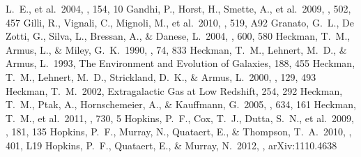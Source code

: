 \documentclass[apj]{emulateapj}
\begin{document}
\begin{thebibliography}{}
  L.~E., et al.\ 2004, \apjs, 154, 10
 Gandhi, P., Horst, H., Smette,
  A., et al.\ 2009, \aap, 502, 457
 Gilli, R., Vignali, C., Mignoli,
  M., et al.\ 2010, \aap, 519, A92
 Granato, G.~L., De Zotti, G.,
  Silva, L., Bressan, A., \& Danese, L.\ 2004, \apj, 600, 580
 Heckman, T.~M., Armus, L., \&
  Miley, G.~K.\ 1990, \apjs, 74, 833
 Heckman, T.~M., Lehnert, M.~D.,
  \& Armus, L.\ 1993, The Environment and Evolution of Galaxies, 188,
  455
 Heckman, T.~M., Lehnert, M.~D.,
  Strickland, D.~K., \& Armus, L.\ 2000, \apjs, 129, 493
 Heckman, T.~M.\ 2002, Extragalactic Gas
  at Low Redshift, 254, 292
 Heckman, T.~M., Ptak, A.,
  Hornschemeier, A., \& Kauffmann, G.\ 2005, \apj, 634, 161
 Heckman, T.~M., et al.\ 2011,
  \apj, 730, 5
 Hopkins, P.~F., Cox, T.~J.,
  Dutta, S.~N., et al.\ 2009, \apjs, 181, 135
 Hopkins, P.~F., Murray, N.,
  Quataert, E., \& Thompson, T.~A.\ 2010, \mnras, 401, L19
 Hopkins, P.~F., Quataert, E., \&
  Murray, N.\ 2012, \mnras, arXiv:1110.4638

\end{thebibliography}
\end{document}
